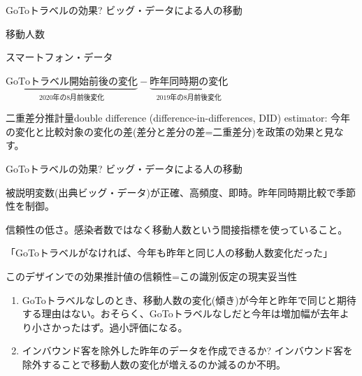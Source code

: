 \begin{frame}[t]{GoToトラベルの効果?}
ビッグ・データによる人の移動
\begin{description}
\vspace{1.0ex}\setlength{\itemsep}{1.0ex}\setlength{\baselineskip}{12pt}
\item[被説明変数]	移動人数
\item[データ]	スマートフォン・データ
\item[効果]	$\underbrace{\mbox{GoToトラベル開始前後の変化}}_{\mbox{2020年の8月前後変化}}-\underbrace{\mbox{昨年同時期の変化}}_{\mbox{2019年の8月前後変化}}$
\item[推計量]	二重差分推計量double difference (difference-in-differences, DID) estimator: 今年の変化と比較対象の変化の差(差分と差分の差=二重差分)を政策の効果と見なす。
\end{description}
\end{frame}

\begin{frame}[t]{GoToトラベルの効果?}
ビッグ・データによる人の移動
\begin{description}
\vspace{1.0ex}\setlength{\itemsep}{1.0ex}\setlength{\baselineskip}{12pt}
\item[長所]	被説明変数(出典ビッグ・データ)が正確、高頻度、即時。昨年同時期比較で季節性を制御。
\item[短所]	信頼性の低さ。感染者数ではなく移動人数という間接指標を使っていること。
\item[識別仮定identification assumption]	「GoToトラベルがなければ、今年も昨年と同じ人の移動人数変化だった」
	\begin{dinglist}{43}
	\vspace{1.0ex}\setlength{\itemsep}{1.0ex}\setlength{\baselineskip}{12pt}
	\item	このデザインでの効果推計値の信頼性=この識別仮定の現実妥当性
	\end{dinglist}
\item[課題] 
	\begin{enumerate}
	\vspace{1.0ex}\setlength{\itemsep}{1.0ex}\setlength{\baselineskip}{12pt}
	\item	GoToトラベルなしのとき、移動人数の変化(傾き)が今年と昨年で同じと期待する理由はない。おそらく、GoToトラベルなしだと今年は増加幅が去年より小さかったはず。過小評価になる。
	\item	インバウンド客を除外した昨年のデータを作成できるか? インバウンド客を除外することで移動人数の変化が増えるのか減るのか不明。
	\end{enumerate}
\end{description}
\end{frame}

